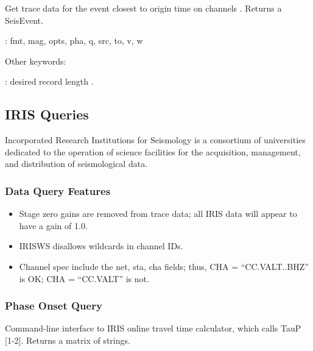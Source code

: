 \documentclass[letterpaper,11pt,english]{sphinxmanual}
\begin{document}
Get trace data for the event closest to origin time  on channels .
Returns a SeisEvent.

\begin{DUlineblock}{0em}
\item[] {\hyperref[\detokenize{src/Appendices/keywords:dkw}]{}}: fmt, mag, opts, pha, q, src, to, v, w
\item[] Other keywords:
\item[] : desired record length .
\end{DUlineblock}


\subsection{IRIS Queries}
\label{\detokenize{src/Web/webclients:iris-queries}}
Incorporated Research Institutions for Seismology  is a consortium of universities dedicated to the operation of science facilities for the acquisition, management, and distribution of seismological data.


\subsubsection{Data Query Features}
\label{\detokenize{src/Web/webclients:data-query-features}}\begin{itemize}
\item {} 
Stage zero gains are removed from trace data; all IRIS data will appear to have a gain of 1.0.

\item {} 
IRISWS disallows wildcards in channel IDs.

\item {} 
Channel spec  include the net, sta, cha fields; thus, CHA = “CC.VALT..BHZ” is OK; CHA = “CC.VALT” is not.

\end{itemize}


\subsubsection{Phase Onset Query}
\label{\detokenize{src/Web/webclients:phase-onset-query}}
Command-line interface to IRIS online travel time calculator, which calls TauP {[}1-2{]}. Returns a matrix of strings.
\end{document}
